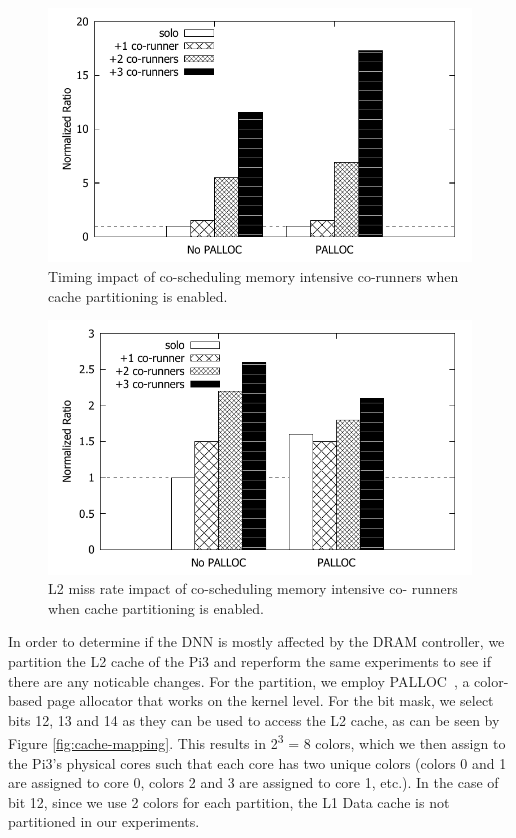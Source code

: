 \begin{figure}[h]
  \centering
  \includegraphics[width=.7\textwidth]{figs/palloc_bandwidth_exectime}
  \caption{Timing impact of co-scheduling memory intensive co-runners 
when cache partitioning is enabled.}
  \label{fig:palloc_bandwidth_exectime}
\end{figure}

\begin{figure}[h]
  \centering
  \includegraphics[width=.7\textwidth]{figs/palloc_bandwidth_l2missrate}
  \caption{L2 miss rate impact of co-scheduling memory intensive co-
runners when cache partitioning is enabled.}
  \label{fig:palloc_bandwidth_l2missrate}
\end{figure}

In order to determine if the DNN is mostly affected by the DRAM 
controller, we partition the L2 cache of the Pi3 and reperform the 
same experiments to see if there are any noticable changes. For the 
partition, we employ PALLOC~\cite{yun2014rtas}, a color-based page 
allocator that works on the kernel level. For the bit mask, we select 
bits 12, 13 and 14 as they can be used to access the L2 cache,
as can be seen by Figure \ref{fig:cache-mapping}. This results in 
2\textsuperscript{3} = 8 colors, which we then assign to the Pi3's 
physical cores such that each core has two unique colors (colors 0 
and 1 are assigned to core 0, colors 2 and 3 are assigned to core 1, 
etc.). In the case of bit 12, since we use 2 colors for each partition,
the L1 Data cache is not partitioned in our experiments.


